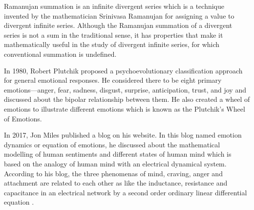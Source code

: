 Ramanujan summation is an infinite divergent series which is a technique invented by the mathematician Srinivasa Ramanujan for assigning a value to divergent infinite series. Although the Ramanujan summation of a divergent series is not a sum in the traditional sense, it has properties that make it mathematically useful in the study of divergent infinite series, for which conventional summation is undefined\cite{enwiki:1148245424}.
\vspace{1\baselineskip}

In 1980, Robert Plutchik proposed a psychoevolutionary classification approach for general emotional responses. He considered there to be eight primary emotions—anger, fear, sadness, disgust, surprise, anticipation, trust, and joy and discussed about the bipolar relationship between them. He also created a wheel of emotions to illustrate different emotions which is known as the Plutchik's Wheel of Emotions\cite{enwiki:1136521972}.
\vspace{1\baselineskip}

In 2017, Jon Miles published a blog on his website. In this blog named emotion dynamics or equation of emotions, he discussed about the mathematical modelling of human sentiments and different states of human mind which is based on the analogy of human mind with an electrical dynamical system. According to his blog, the three phenomenas of mind, craving, anger and attachment are related to each other as like the inductance, resistance and capacitance in an electrical network by a second order ordinary linear differential equation \cite{milesresearch}.
